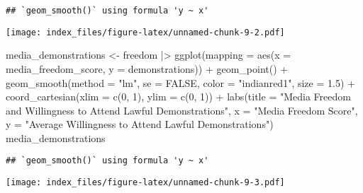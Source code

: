 \documentclass[
]{article}
\newenvironment{Shaded}{\begin{snugshade}}{\end{snugshade}}
\newcommand{\AttributeTok}[1]{\textcolor[rgb]{0.77,0.63,0.00}{#1}}
\newcommand{\ConstantTok}[1]{\textcolor[rgb]{0.00,0.00,0.00}{#1}}
\newcommand{\DecValTok}[1]{\textcolor[rgb]{0.00,0.00,0.81}{#1}}
\newcommand{\FloatTok}[1]{\textcolor[rgb]{0.00,0.00,0.81}{#1}}
\newcommand{\FunctionTok}[1]{\textcolor[rgb]{0.00,0.00,0.00}{#1}}
\newcommand{\NormalTok}[1]{#1}
\newcommand{\OtherTok}[1]{\textcolor[rgb]{0.56,0.35,0.01}{#1}}
\newcommand{\SpecialCharTok}[1]{\textcolor[rgb]{0.00,0.00,0.00}{#1}}
\newcommand{\StringTok}[1]{\textcolor[rgb]{0.31,0.60,0.02}{#1}}
\begin{document}
\begin{verbatim}
## `geom_smooth()` using formula 'y ~ x'
\end{verbatim}

\texttt{[image: index\_files/figure-latex/unnamed-chunk-9-2.pdf]}

\begin{Shaded}
\begin{Highlighting}[]
\NormalTok{media\_demonstrations }\OtherTok{\textless{}{-}}\NormalTok{ freedom }\SpecialCharTok{|\textgreater{}}
  \FunctionTok{ggplot}\NormalTok{(}\AttributeTok{mapping =} \FunctionTok{aes}\NormalTok{(}\AttributeTok{x =}\NormalTok{ media\_freedom\_score,}
         \AttributeTok{y =}\NormalTok{ demonstrations)) }\SpecialCharTok{+}
  \FunctionTok{geom\_point}\NormalTok{() }\SpecialCharTok{+} 
  \FunctionTok{geom\_smooth}\NormalTok{(}\AttributeTok{method =} \StringTok{"lm"}\NormalTok{, }\AttributeTok{se =} \ConstantTok{FALSE}\NormalTok{, }\AttributeTok{color =} \StringTok{"indianred1"}\NormalTok{, }\AttributeTok{size =} \FloatTok{1.5}\NormalTok{) }\SpecialCharTok{+}
  \FunctionTok{coord\_cartesian}\NormalTok{(}\AttributeTok{xlim =} \FunctionTok{c}\NormalTok{(}\DecValTok{0}\NormalTok{, }\DecValTok{1}\NormalTok{), }\AttributeTok{ylim =} \FunctionTok{c}\NormalTok{(}\DecValTok{0}\NormalTok{, }\DecValTok{1}\NormalTok{)) }\SpecialCharTok{+}
  \FunctionTok{labs}\NormalTok{(}\AttributeTok{title =} \StringTok{"Media Freedom and Willingness to Attend Lawful Demonstrations"}\NormalTok{,}
       \AttributeTok{x =} \StringTok{"Media Freedom Score"}\NormalTok{,}
       \AttributeTok{y =} \StringTok{"Average Willingness to Attend Lawful Demonstrations"}\NormalTok{)}
\NormalTok{media\_demonstrations}
\end{Highlighting}
\end{Shaded}

\begin{verbatim}
## `geom_smooth()` using formula 'y ~ x'
\end{verbatim}

\texttt{[image: index\_files/figure-latex/unnamed-chunk-9-3.pdf]}
\end{document}
